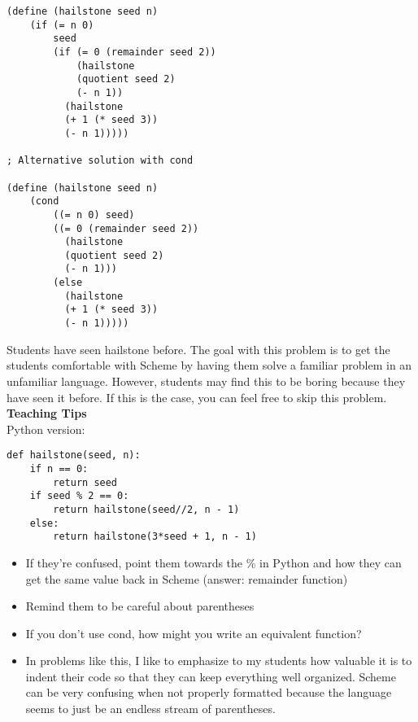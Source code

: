 \begin{solution}[-32pt]
\begin{blocksection}
\begin{lstlisting}
(define (hailstone seed n)
    (if (= n 0)
        seed
        (if (= 0 (remainder seed 2))
            (hailstone
            (quotient seed 2)
            (- n 1))
          (hailstone
          (+ 1 (* seed 3))
          (- n 1)))))

; Alternative solution with cond

(define (hailstone seed n)
    (cond 
        ((= n 0) seed)
        ((= 0 (remainder seed 2))
          (hailstone
          (quotient seed 2)
          (- n 1)))
        (else 
          (hailstone
          (+ 1 (* seed 3))
          (- n 1)))))
\end{lstlisting}
\end{blocksection}
\end{solution}


\begin{guide}
\begin{blocksection}
Students have seen hailstone before. The goal with this problem is to get the students comfortable with Scheme by having them solve a familiar problem in an unfamiliar language. However, students may find this to be boring because they have seen it before. If this is the case, you can feel free to skip this problem. 
\vspace{10px} \\

\textbf{Teaching Tips} \\
Python version:
\begin{lstlisting}
def hailstone(seed, n):
    if n == 0:
        return seed
    if seed % 2 == 0:
        return hailstone(seed//2, n - 1)
    else:
        return hailstone(3*seed + 1, n - 1)
\end{lstlisting}
\begin{itemize}
    \item If they’re confused, point them towards the \% in Python and how they can get the same value back in Scheme (answer: remainder function) 
    \item Remind them to be careful about parentheses
    \item If you don’t use cond, how might you write an equivalent function? 
    \item In problems like this, I like to emphasize to my students how valuable it is to indent their code so that they can keep everything well organized. Scheme can be very confusing when not properly formatted because the language seems to just be an endless stream of parentheses. 
\end{itemize}
\end{blocksection}
\end{guide}